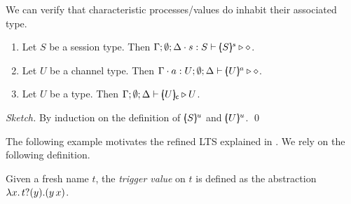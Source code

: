 

\noi We can verify that characteristic processes/values  
do inhabit their associated type.

\begin{proposition}
	\begin{enumerate}
		\item	
				Let $S$ be a session type.
				Then $\Gamma; \emptyset; \Delta \cdot s: S \vdash [\!\!(S)\!\!]^{s} \triangleright \diamond$.
		\item	
				Let $U$ be a channel type.
				Then $\Gamma \cdot a: U; \emptyset; \Delta \vdash [\!\!(U)\!\!]^{a} \triangleright \diamond$.

		\item	Let $U$ be a type.
				Then $\Gamma; \emptyset; \Delta \vdash [\!\!(U)\!\!]_{\mathsf{c}} \triangleright U$.
	\end{enumerate}
\end{proposition}

\begin{proof}[Sketch]
	By induction on the definition of $[\!\!(S)\!\!]^{u}$
	and $[\!\!(U)\!\!]^{u}$. 
	\qed
\end{proof}


The following example motivates the refined 
LTS explained in .
We rely on the following definition.

\begin{definition}\label{d:trigger}
Given a fresh name $t$, the \emph{trigger value} on $t$ is defined as the abstraction
$\lambda {x}.\,t ? (y) . (y\, {{x}})$.
\end{definition}



